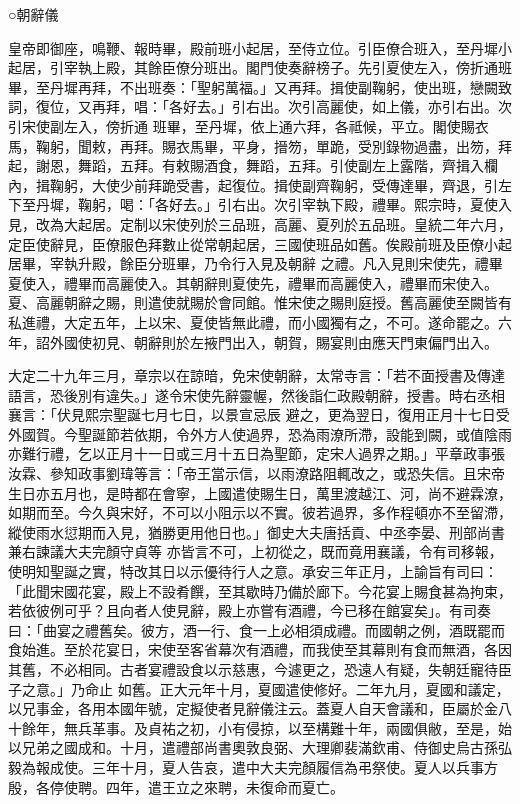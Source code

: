 \begin{pinyinscope}
 ○朝辭儀



 皇帝即御座，鳴鞭、報時畢，殿前班小起居，至侍立位。引臣僚合班入，至丹墀小起居，引宰執上殿，其餘臣僚分班出。閣門使奏辭榜子。先引夏使左入，傍折通班畢，至丹墀再拜，不出班奏：「聖躬萬福。」又再拜。揖使副鞠躬，使出班，戀闕致詞，復位，又再拜，唱：「各好去。」引右出。次引高麗使，如上儀，亦引右出。次引宋使副左入，傍折通
 班畢，至丹墀，依上通六拜，各祗候，平立。閣使賜衣馬，鞠躬，聞敕，再拜。賜衣馬畢，平身，搢笏，單跪，受別錄物過盡，出笏，拜起，謝恩，舞蹈，五拜。有敕賜酒食，舞蹈，五拜。引使副左上露階，齊揖入欄內，揖鞠躬，大使少前拜跪受書，起復位。揖使副齊鞠躬，受傳達畢，齊退，引左下至丹墀，鞠躬，喝：「各好去。」引右出。次引宰執下殿，禮畢。熙宗時，夏使入見，改為大起居。定制以宋使列於三品班，高麗、夏列於五品班。皇統二年六月，定臣使辭見，臣僚服色拜數止從常朝起居，三國使班品如舊。俟殿前班及臣僚小起居畢，宰執升殿，餘臣分班畢，乃令行入見及朝辭
 之禮。凡入見則宋使先，禮畢夏使入，禮畢而高麗使入。其朝辭則夏使先，禮畢而高麗使入，禮畢而宋使入。夏、高麗朝辭之賜，則遣使就賜於會同館。惟宋使之賜則庭授。舊高麗使至闕皆有私進禮，大定五年，上以宋、夏使皆無此禮，而小國獨有之，不可。遂命罷之。六年，詔外國使初見、朝辭則於左掖門出入，朝賀，賜宴則由應天門東偏門出入。



 大定二十九年三月，章宗以在諒暗，免宋使朝辭，太常寺言：「若不面授書及傳達語言，恐後別有違失。」遂令宋使先辭靈幄，然後詣仁政殿朝辭，授書。時右丞相襄言：「伏見熙宗聖誕七月七日，以景宣忌辰
 避之，更為翌日，復用正月十七日受外國賀。今聖誕節若依期，令外方人使過界，恐為雨潦所滯，設能到闕，或值陰雨亦難行禮，乞以正月十一日或三月十五日為聖節，定宋人過界之期。」平章政事張汝霖、參知政事劉瑋等言：「帝王當示信，以雨潦路阻輒改之，或恐失信。且宋帝生日亦五月也，是時都在會寧，上國遣使賜生日，萬里渡越江、河，尚不避霖潦，如期而至。今久與宋好，不可以小阻示以不實。彼若過界，多作程頓亦不至留滯，縱使雨水愆期而入見，猶勝更用他日也。」御史大夫唐括貢、中丞李晏、刑部尚書兼右諫議大夫完顏守貞等
 亦皆言不可，上初從之，既而竟用襄議，令有司移報，使明知聖誕之實，特改其日以示優待行人之意。承安三年正月，上諭旨有司曰：「此聞宋國花宴，殿上不設肴饌，至其歇時乃備於廊下。今花宴上賜食甚為拘束，若依彼例可乎？且向者人使見辭，殿上亦嘗有酒禮，今已移在館宴矣」。有司奏曰：「曲宴之禮舊矣。彼方，酒一行、食一上必相須成禮。而國朝之例，酒既罷而食始進。至於花宴日，宋使至客省幕次有酒禮，而我使至其幕則有食而無酒，各因其舊，不必相同。古者宴禮設食以示慈惠，今遽更之，恐遠人有疑，失朝廷寵待臣子之意。」乃命止
 如舊。正大元年十月，夏國遣使修好。二年九月，夏國和議定，以兄事金，各用本國年號，定擬使者見辭儀注云。蓋夏人自天會議和，臣屬於金八十餘年，無兵革事。及貞祐之初，小有侵掠，以至構難十年，兩國俱敝，至是，始以兄弟之國成和。十月，遣禮部尚書奧敦良弼、大理卿裴滿欽甫、侍御史烏古孫弘毅為報成使。三年十月，夏人告哀，遣中大夫完顏履信為弔祭使。夏人以兵事方殷，各停使聘。四年，遣王立之來聘，未復命而夏亡。




\end{pinyinscope}
